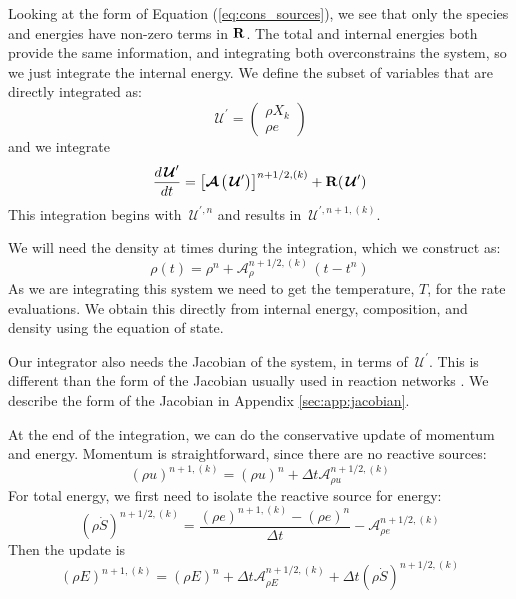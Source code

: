 \documentclass[linenumbers,trackchanges]{aastex631}
\newcommand{\Sdot}{\dot{S}}
\newcommand{\odt}[1]{{\frac{{d#1}}{dt}}}
\newcommand{\Uc}{{\,\bm{\mathcal{U}}}}
\newcommand{\Rb}{{\bf R}}
\newcommand{\Adv}[1]{{\left [\boldsymbol{\mathcal{A}} \left(#1\right)\right]}}
\begin{document}
\begin{itemize}
\begin{itemize}
    Looking at the form of Equation (\ref{eq:cons_sources}), we see that only
    the species and energies have non-zero terms in $\Rb$.  The total and
    internal energies both provide the same information, and
    integrating both overconstrains the system, so we just integrate
    the internal energy.  We define the subset of variables that are
    directly integrated as:
    \begin{equation}
      \Uc^\prime = \left ( \begin{array}{c} \rho X_k \\ \rho e \end{array} \right )
    \end{equation}
    and we integrate
    \begin{equation}
      \odt{\Uc^\prime} = \Adv{\Uc^\prime}^{n+1/2,(k)} + \Rb(\Uc^\prime)
    \end{equation}
    This integration begins with $\Uc^{\prime,n}$ and results in $\Uc^{\prime,n+1,(k)}$.

    We will need the density at times during the integration, which we construct as:
    \begin{equation}
      \rho(t) = \rho^n + \mathcal{A}_\rho^{n+1/2,(k)} \, (t - t^n)
    \end{equation}
    As we are integrating this system we need to get the temperature,
    $T$, for the rate evaluations.  We obtain this directly from
    internal energy, composition, and density using the equation of
    state.

    Our integrator also needs the Jacobian of the system, in terms of
    $\Uc^\prime$.  This is different than the form of the Jacobian
    usually used in reaction networks .  We describe the form of the Jacobian in Appendix
    \ref{sec:app:jacobian}.


    At the end of the integration, we can do the conservative update of momentum
    and energy.  Momentum is straightforward, since there are no reactive sources:
    \begin{equation}
      (\rho u)^{n+1,(k)} = (\rho u)^n + \Delta t \mathcal{A}_{\rho u}^{n+1/2,(k)}
    \end{equation}
    For total energy, we first need to isolate the reactive source for energy:
    \begin{equation}
      (\rho \Sdot)^{n+1/2,(k)} = \frac{(\rho e)^{n+1,(k)} - (\rho e)^n}{\Delta t} - \mathcal{A}_{\rho e}^{n+1/2,(k)}
    \end{equation}
    Then the update is
    \begin{equation}
      (\rho E)^{n+1,(k)} = (\rho E)^n + \Delta t \mathcal{A}_{\rho E}^{n+1/2,(k)} + \Delta t (\rho \Sdot)^{n+1/2,(k)}
    \end{equation}


\end{itemize}
\end{itemize}
\end{document}
